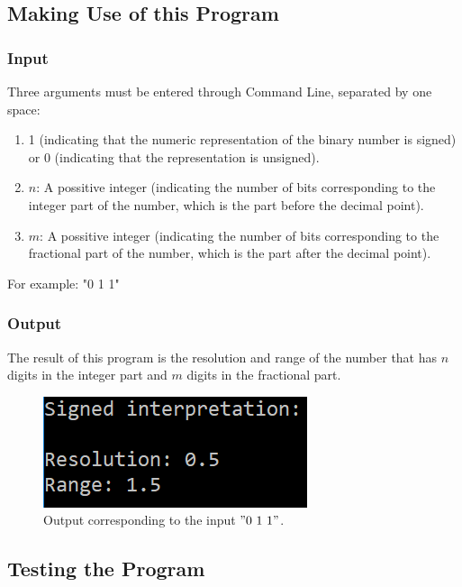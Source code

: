 \documentclass[a4paper,12pt]{report}
\begin{document}
\subsection{\color{purple}Making Use of this Program}
\subsubsection{\color{orange}Input}
Three arguments must be entered through Command Line, separated by one space:
\begin{enumerate}
\item  1 (indicating that the numeric representation of the binary number is signed) or 0 (indicating that the representation is unsigned).
\item $n$: A possitive integer (indicating the number of bits corresponding to the integer part of the number, which is the part before the decimal point).
\item  $m$: A possitive integer (indicating the number of bits corresponding to the fractional part of the number, which is the part after the decimal point).
\end{enumerate}
{\color{cyan}For example: "0 1 1"}

\subsubsection{\color{orange}Output}
The result of this program is the resolution and range of the number that has $n$ digits in the integer part and $m$ digits in the fractional part.

\begin{figure}[h!]
\centering
\includegraphics[scale=1]{ejemploOutput}
\caption{\color{cyan}Output corresponding to the input $"0\ 1\ 1"$.}
\label{image output}
\end{figure}

\subsection{\color{purple}Testing the Program}



\end{document}
